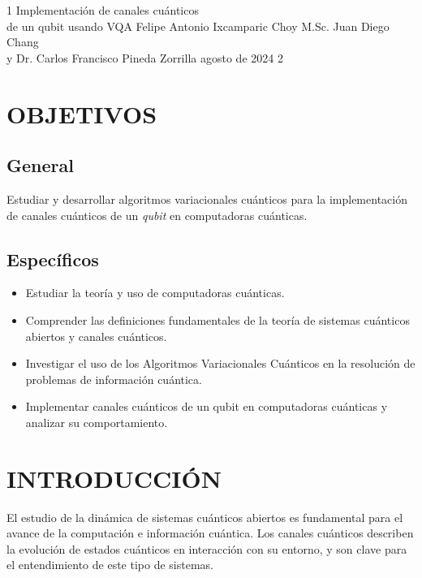 \documentclass[letterpaper,12pt]{thesisECFM}
\theoremstyle{plain}
\theoremstyle{definition}
\theoremstyle{remark}
\newcommand{\1}{\mathbb{1}}
\begin{document}
\datosThesis%
{1}%
{Implementación de canales cuánticos \\ de un qubit usando VQA}%
{Felipe Antonio Ixcamparic Choy}%
{M.Sc. Juan Diego Chang\\y Dr. Carlos Francisco Pineda Zorrilla}%
{agosto de 2024}		%
{2}							%

\tableofcontents    %

\mainmatter

\chapter*{OBJETIVOS}
\section*{General} 
Estudiar  y desarrollar algoritmos variacionales cuánticos para la implementación de canales cuánticos de un \textit{qubit} en computadoras cuánticas.

\section*{Específicos}
\begin{itemize}
    \item Estudiar la teoría y uso de computadoras cuánticas.
    \item Comprender las definiciones fundamentales de la teoría de sistemas cuánticos abiertos y canales cuánticos.
    \item Investigar el uso de los Algoritmos Variacionales Cuánticos en la resolución de problemas de información cuántica.
    \item Implementar canales cuánticos de un qubit en computadoras cuánticas y analizar su comportamiento.
\end{itemize}

\chapter*{INTRODUCCIÓN}
El estudio de la dinámica de sistemas cuánticos abiertos es fundamental para el avance de la computación e información cuántica. Los canales cuánticos describen la evolución de estados cuánticos en  interacción con su entorno, y son clave para el entendimiento de este tipo de sistemas.
\end{document}
